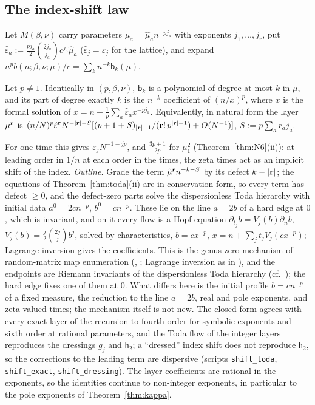 \subsection{The index-shift law}\label{sec:indexshift}
Let $M(\beta,\nu)$ carry parameters $\mu_a=\hat\mu_an^{-pj_a}$ with exponents $j_1,\dots,j_r$, put
$\hat\varepsilon_a:=\frac{pj_a}2\binom{2j_a}{j_a}c^{j_a}\hat\mu_a$ ($\hat\varepsilon_j=\varepsilon_j$ for the lattice), and expand
$n^pb(n;\beta,\nu;\mu)/c=\sum_kn^{-k}\mathsf b_k(\mu)$.

\begin{theorem}\label{thm:indexshift}
Let $p\ne1$. Identically in $(p,\beta,\nu)$, $\mathsf b_k$ is a polynomial of degree at most $k$ in $\mu$, and its part of degree exactly $k$ is the
$n^{-k}$ coefficient of $(n/x)^p$, where $x$ is the formal solution of $x=n-\frac1p\sum_a\hat\varepsilon_ax^{-pj_a}$. Equivalently, in natural
form the layer $\mu^{\mathbf r}$ is $(n/N)^p\hat\varepsilon^{\mathbf r}N^{-|\mathbf r|-S}[(p+1+S)_{|\mathbf r|-1}/(\mathbf r!\,p^{|\mathbf r|-1})+O(N^{-1})]$, $S:=p\sum_ar_aj_a$.
\end{theorem}

For one time this gives $\varepsilon_jN^{-1-jp}$, and $\frac{3p+1}{2p}$ for $\mu_1^2$ (Theorem~\ref{thm:N6}(ii)): at leading order in $1/n$ at each
order in the times, the zeta times act as an implicit shift of the index. \emph{Outline.} Grade the term $\hat\mu^{\mathbf r}n^{-k-S}$ by its
defect $k-|\mathbf r|$; the equations of Theorem~\ref{thm:toda}(ii) are in conservation form, so every term has defect $\ge0$, and the defect-zero parts
solve the dispersionless Toda hierarchy with initial data $a^0=2cn^{-p}$, $b^0=cn^{-p}$. These lie on the line $a=2b$ of a hard edge at $0$,
which is invariant, and on it every flow is a Hopf equation $\partial_{t_j}b=V_j(b)\partial_nb$, $V_j(b)=\frac j2\binom{2j}jb^j$, solved by
characteristics, $b=cx^{-p}$, $x=n+\sum_jt_jV_j(cx^{-p})$; Lagrange inversion gives the coefficients. This is the genus-zero mechanism of
random-matrix map enumeration (\cite[Section~2.3]{Ercolani}, \cite{EMP}; Lagrange inversion as in \cite[Section~26.4]{Bouttier}), and the
endpoints are Riemann invariants of the dispersionless Toda hierarchy (cf.~\cite{KonopelchenkoMAM}); the hard edge fixes one of them at $0$.
What differs here is the initial profile $b=cn^{-p}$ of a fixed measure, the reduction to the line $a=2b$, real and pole exponents, and
zeta-valued times; the mechanism itself is not new. The closed form agrees with every exact layer of the recursion to fourth order for
symbolic exponents and sixth order at rational parameters, and the Toda flow of the integer layers reproduces the dressings $g_j$ and $\mathsf h_2$; a
``dressed'' index shift does not reproduce $\mathsf h_2$, so the corrections to the leading term are dispersive (scripts \texttt{shift\_toda},
\texttt{shift\_exact}, \texttt{shift\_dressing}). The layer coefficients are rational in the exponents, so the identities continue to
non-integer exponents, in particular to the pole exponents of Theorem~\ref{thm:kappa}.


